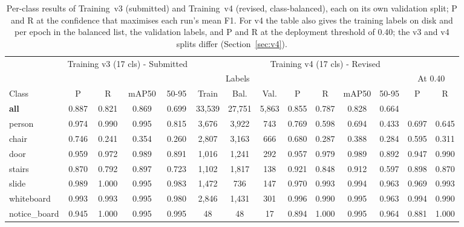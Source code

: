 \documentclass[3p,times,procedia]{elsarticle}
\DeclareRobustCommand{\rev}[1]{{\hlattr=1 #1}}
\DeclareRobustCommand{\rev}[1]{\hl{#1}}
\DeclareRobustCommand{\rev}[1]{#1}
\begin{document}
\begin{table}[!t]
\caption{\rev{Per-class results of Training~v3 (submitted) and Training~v4
(revised, class-balanced)}, each on its own validation split; \rev{P and R at the
confidence that maximises each run's mean F1.} For v4 the table also gives
the training labels on disk and per epoch in the balanced list, the
validation labels, and \rev{P and R at the deployment threshold of 0.40}; the v3
and v4 splits differ (Section~\ref{sec:v4}).}
\label{tab:perclass}
\scriptsize
\setlength{\tabcolsep}{2.5pt}
\begin{tabular*}{\hsize}{@{\extracolsep{\fill}}lccccccccccccc@{}}
\toprule
& \multicolumn{4}{c}{Training v3 (17 cls) - Submitted}
& \multicolumn{9}{c}{Training v4 (17 cls) - Revised} \\
& & & & & \multicolumn{3}{c}{Labels} & & & & & \multicolumn{2}{c}{At 0.40} \\
Class & P & R & mAP50 & 50-95 & Train & Bal. & Val. & P & R & mAP50 & 50-95 & P & R \\
\colrule
\textbf{all} & 0.887 & 0.821 & 0.869 & 0.699 & \rev{33,539} & \rev{27,751} & \rev{5,863} & \rev{0.855} & \rev{0.787} & \rev{0.828} & \rev{0.664} & & \\
person & 0.974 & 0.990 & 0.995 & 0.815 & \rev{3,676} & \rev{3,922} & \rev{743} & \rev{0.769} & \rev{0.598} & \rev{0.694} & \rev{0.433} & \rev{0.697} & \rev{0.645} \\
chair & 0.746 & 0.241 & 0.354 & 0.260 & \rev{2,807} & \rev{3,163} & \rev{666} & \rev{0.680} & \rev{0.287} & \rev{0.388} & \rev{0.284} & \rev{0.595} & \rev{0.311} \\
door & 0.959 & 0.972 & 0.989 & 0.891 & \rev{1,016} & \rev{1,241} & \rev{292} & \rev{0.957} & \rev{0.979} & \rev{0.989} & \rev{0.892} & \rev{0.947} & \rev{0.990} \\
stairs & 0.870 & 0.792 & 0.897 & 0.723 & \rev{1,102} & \rev{1,817} & \rev{138} & \rev{0.921} & \rev{0.848} & \rev{0.912} & \rev{0.597} & \rev{0.898} & \rev{0.870} \\
slide & 0.989 & 1.000 & 0.995 & 0.983 & \rev{1,472} & \rev{736} & \rev{147} & \rev{0.970} & \rev{0.993} & \rev{0.994} & \rev{0.963} & \rev{0.969} & \rev{0.993} \\
whiteboard & 0.993 & 0.993 & 0.995 & 0.980 & \rev{2,846} & \rev{1,431} & \rev{301} & \rev{0.996} & \rev{0.990} & \rev{0.995} & \rev{0.963} & \rev{0.994} & \rev{0.990} \\
notice\_board & 0.945 & 1.000 & 0.995 & 0.995 & \rev{48} & \rev{48} & \rev{17} & \rev{0.894} & \rev{1.000} & \rev{0.995} & \rev{0.964} & \rev{0.881} & \rev{1.000} \\

\end{tabular*}
\end{table}
\end{document}
